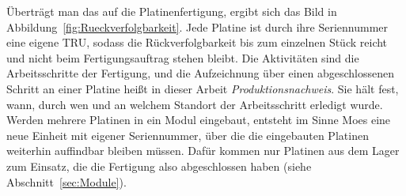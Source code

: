 Überträgt man das auf die Platinenfertigung, ergibt sich das Bild in
Abbildung~\ref{fig:Rueckverfolgbarkeit}. Jede Platine ist durch ihre
Seriennummer eine eigene TRU, sodass die Rückverfolgbarkeit bis zum einzelnen
Stück reicht und nicht beim Fertigungsauftrag stehen bleibt. Die Aktivitäten
sind die Arbeitsschritte der Fertigung, und die Aufzeichnung über einen
abgeschlossenen Schritt an einer Platine heißt in dieser Arbeit
\emph{Produktionsnachweis}. Sie hält fest, wann, durch wen und an welchem
Standort der Arbeitsschritt erledigt wurde. Werden mehrere Platinen in ein Modul
eingebaut, entsteht im Sinne Moes eine neue Einheit mit eigener Seriennummer,
über die die eingebauten Platinen weiterhin auffindbar bleiben müssen. Dafür
kommen nur Platinen aus dem Lager zum Einsatz, die die Fertigung also
abgeschlossen haben (siehe Abschnitt~\ref{sec:Module}).

